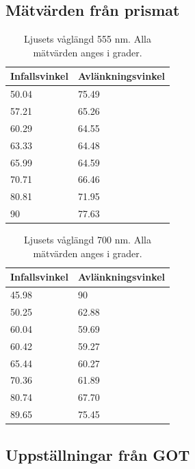 \documentclass[a4paper]{article}
\begin{document}
\subsection{Mätvärden från prismat}

\begin{table}[h]
    \begin{tabular}{|l|l|}
    \hline
    Infallsvinkel & Avlänkningsvinkel \\ \hline
    50.04         & 75.49             \\ \hline
    57.21         & 65.26             \\ \hline
    60.29         & 64.55             \\ \hline
    63.33         & 64.48             \\ \hline
    65.99         & 64.59             \\ \hline
    70.71         & 66.46             \\ \hline
    80.81         & 71.95             \\ \hline
    90            & 77.63             \\ \hline
    \end{tabular}
    \caption{Ljusets våglängd 555 nm. Alla mätvärden anges i grader.}
    \label{tb:555}
\end{table}

\begin{table}[h]
    \begin{tabular}{|l|l|}
    \hline
    Infallsvinkel & Avlänkningsvinkel \\ \hline
    45.98         & 90                \\ \hline
    50.25         & 62.88             \\ \hline
    60.04         & 59.69             \\ \hline
    60.42         & 59.27             \\ \hline
    65.44         & 60.27             \\ \hline
    70.36         & 61.89             \\ \hline
    80.74         & 67.70             \\ \hline
    89.65         & 75.45             \\ \hline
    \end{tabular}
    \caption{Ljusets våglängd 700 nm. Alla mätvärden anges i grader.}
    \label{tb:700}
\end{table}
\pagebreak
\subsection{Uppställningar från GOT}
\end{document}
